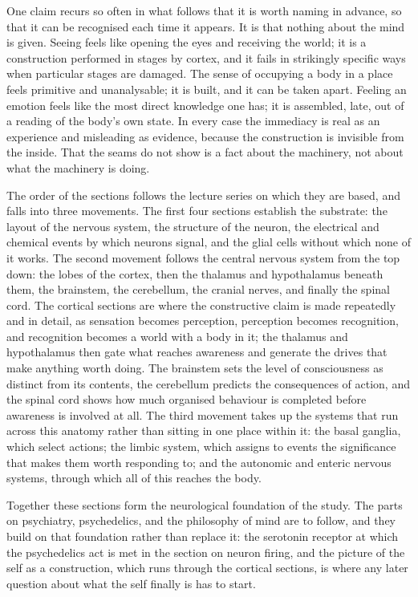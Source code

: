 \documentclass[11pt]{article}
\begin{document}
One claim recurs so often in what follows that it is worth naming in advance, so that it can be recognised each time it appears. It is that nothing about the mind is given. Seeing feels like opening the eyes and receiving the world; it is a construction performed in stages by cortex, and it fails in strikingly specific ways when particular stages are damaged. The sense of occupying a body in a place feels primitive and unanalysable; it is built, and it can be taken apart. Feeling an emotion feels like the most direct knowledge one has; it is assembled, late, out of a reading of the body's own state. In every case the immediacy is real as an experience and misleading as evidence, because the construction is invisible from the inside. That the seams do not show is a fact about the machinery, not about what the machinery is doing.

The order of the sections follows the lecture series on which they are based, and falls into three movements. The first four sections establish the substrate: the layout of the nervous system, the structure of the neuron, the electrical and chemical events by which neurons signal, and the glial cells without which none of it works. The second movement follows the central nervous system from the top down: the lobes of the cortex, then the thalamus and hypothalamus beneath them, the brainstem, the cerebellum, the cranial nerves, and finally the spinal cord. The cortical sections are where the constructive claim is made repeatedly and in detail, as sensation becomes perception, perception becomes recognition, and recognition becomes a world with a body in it; the thalamus and hypothalamus then gate what reaches awareness and generate the drives that make anything worth doing. The brainstem sets the level of consciousness as distinct from its contents, the cerebellum predicts the consequences of action, and the spinal cord shows how much organised behaviour is completed before awareness is involved at all. The third movement takes up the systems that run across this anatomy rather than sitting in one place within it: the basal ganglia, which select actions; the limbic system, which assigns to events the significance that makes them worth responding to; and the autonomic and enteric nervous systems, through which all of this reaches the body.

Together these sections form the neurological foundation of the study. The parts on psychiatry, psychedelics, and the philosophy of mind are to follow, and they build on that foundation rather than replace it: the serotonin receptor at which the psychedelics act is met in the section on neuron firing, and the picture of the self as a construction, which runs through the cortical sections, is where any later question about what the self finally is has to start.
\end{document}
